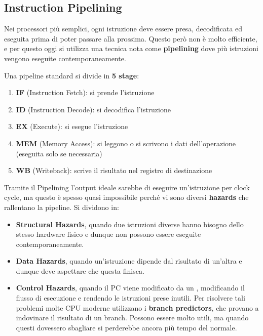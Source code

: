 \documentclass[11pt, a4paper, titlepage, oneside]{scrbook}
\begin{document}
\subsection{Instruction Pipelining}

\begin{Definizione}[Pipelining]
\label{def-pipelining}
Nei processori più semplici, ogni istruzione deve essere presa, decodificata ed eseguita prima di poter passare alla prossima. Questo però non è molto efficiente, e per questo oggi si utilizza una tecnica nota come \textbf{pipelining} dove più istruzioni vengono eseguite contemporaneamente.
\end{Definizione}

\begin{Proprieta}
\label{prop-RISC-5-stage-pipeline}
Una pipeline standard si divide in \textbf{5 stage}:
\begin{enumerate}[label=\arabic*°]
    \item \textbf{IF} (Instruction Fetch): si prende l'istruzione
    \item \textbf{ID} (Instruction Decode): si decodifica l'istruzione
    \item \textbf{EX} (Execute): si esegue l'istruzione
    \item \textbf{MEM} (Memory Access): si leggono o si scrivono i dati dell'operazione (eseguita solo se necessaria)
    \item \textbf{WB} (Writeback): scrive il risultato nel registro di destinazione
\end{enumerate}
\end{Proprieta}

\begin{Proprieta}
\label{prop-pipeline-hazard}

Tramite il Pipelining l'output ideale sarebbe di eseguire un'istruzione per clock cycle, ma questo è spesso quasi impossibile perché vi sono diversi \textbf{hazards} che rallentano la pipeline. Si dividono in:
\begin{itemize}
    \item \textbf{Structural Hazards}, quando due istruzioni diverse hanno bisogno dello stesso hardware fisico e dunque non possono essere eseguite contemporaneamente.
    \item \textbf{Data Hazards}, quando un'istruzione dipende dal risultato di un'altra e dunque deve aspettare che questa finisca.
    \item \textbf{Control Hazards}, quando il PC viene modificato da un , modificando il flusso di esecuzione e rendendo le istruzioni prese inutili. Per risolvere tali problemi molte CPU moderne utilizzano i \textbf{branch predictors}, che provano a indovinare il risultato di un branch. Possono essere molto utili, ma quando questi dovessero sbagliare si perderebbe ancora più tempo del normale. 
\end{itemize}
\end{Proprieta}
\end{document}
